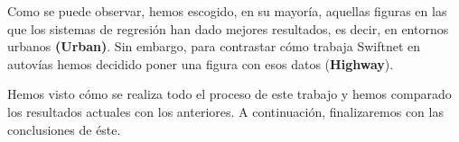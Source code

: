 Como se puede observar, hemos escogido, en su mayoría, aquellas figuras en las que los sistemas de regresión han dado mejores resultados, es decir, en entornos urbanos \textbf{(Urban)}. Sin embargo, para contrastar cómo trabaja Swiftnet en autovías hemos decidido poner una figura con esos datos (\textbf{Highway}).

Hemos visto cómo se realiza todo el proceso de este trabajo y hemos comparado los resultados actuales con los anteriores. A continuación, finalizaremos con las conclusiones de éste.